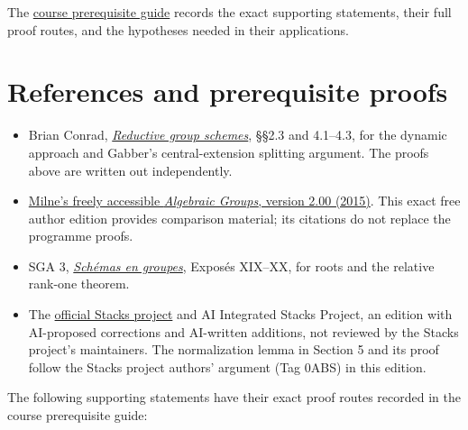 \documentclass[11pt,a4paper,openany]{report}
\providecommand{\tightlist}{\setlength{\itemsep}{0pt}\setlength{\parskip}{0pt}}
\begin{document}
The \href{prerequisites.html}{course prerequisite guide} records the exact supporting statements, their full proof routes, and the hypotheses needed in their applications.

\section{References and prerequisite proofs}\label{AG-RG-03-references-and-prerequisite-proofs}

\begin{itemize}
\tightlist
\item
  Brian Conrad, \href{https://math.stanford.edu/~conrad/papers/luminysga3.pdf}{\emph{Reductive group schemes}}, §§2.3 and 4.1--4.3, for the dynamic approach and Gabber's central-extension splitting argument. The proofs above are written out independently.
\item
  \href{https://www.jmilne.org/math/CourseNotes/iAG200.pdf}{Milne's freely accessible \emph{Algebraic Groups}, version 2.00 (2015)}. This exact free author edition provides comparison material; its citations do not replace the programme proofs.
\item
  SGA 3, \href{https://webusers.imj-prg.fr/~patrick.polo/SGA3/}{\emph{Schémas en groupes}}, Exposés XIX--XX, for roots and the relative rank-one theorem.
\item
  The \href{https://stacks.math.columbia.edu/}{official Stacks project} and AI Integrated Stacks Project, an edition with AI-proposed corrections and AI-written additions, not reviewed by the Stacks project's maintainers. The normalization lemma in Section 5 and its proof follow the Stacks project authors' argument (Tag 0ABS) in this edition.
\end{itemize}

The following supporting statements have their exact proof routes recorded in the course prerequisite guide:
\end{document}
